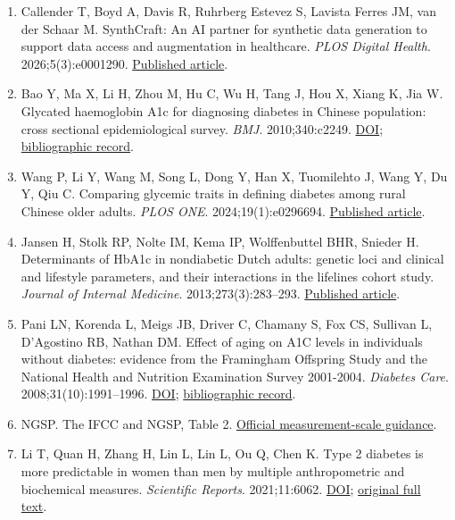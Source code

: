 \documentclass[10pt,twocolumn]{article}
\begin{document}
\begin{enumerate}
\item Callender T, Boyd A, Davis R, Ruhrberg Estevez S, Lavista Ferres JM, van der Schaar M. SynthCraft: An AI partner for synthetic data generation to support data access and augmentation in healthcare. \emph{PLOS Digital Health}. 2026;5(3):e0001290. \href{https://journals.plos.org/digitalhealth/article?id=10.1371/journal.pdig.0001290}{Published article}.

\item Bao Y, Ma X, Li H, Zhou M, Hu C, Wu H, Tang J, Hou X, Xiang K, Jia W. Glycated haemoglobin A1c for diagnosing diabetes in Chinese population: cross sectional epidemiological survey. \emph{BMJ}. 2010;340:c2249. \href{https://doi.org/10.1136/bmj.c2249}{DOI}; \href{https://pubmed.ncbi.nlm.nih.gov/20478961/}{bibliographic record}.

\item Wang P, Li Y, Wang M, Song L, Dong Y, Han X, Tuomilehto J, Wang Y, Du Y, Qiu C. Comparing glycemic traits in defining diabetes among rural Chinese older adults. \emph{PLOS ONE}. 2024;19(1):e0296694. \href{https://journals.plos.org/plosone/article?id=10.1371/journal.pone.0296694}{Published article}.

\item Jansen H, Stolk RP, Nolte IM, Kema IP, Wolffenbuttel BHR, Snieder H. Determinants of HbA1c in nondiabetic Dutch adults: genetic loci and clinical and lifestyle parameters, and their interactions in the lifelines cohort study. \emph{Journal of Internal Medicine}. 2013;273(3):283–293. \href{https://onlinelibrary.wiley.com/doi/10.1111/joim.12010}{Published article}.

\item Pani LN, Korenda L, Meigs JB, Driver C, Chamany S, Fox CS, Sullivan L, D'Agostino RB, Nathan DM. Effect of aging on A1C levels in individuals without diabetes: evidence from the Framingham Offspring Study and the National Health and Nutrition Examination Survey 2001-2004. \emph{Diabetes Care}. 2008;31(10):1991–1996. \href{https://doi.org/10.2337/dc08-0577}{DOI}; \href{https://pubmed.ncbi.nlm.nih.gov/18628569/}{bibliographic record}.

\item NGSP. The IFCC and NGSP, Table 2. \href{https://ngsp.org/ifccngsp.asp}{Official measurement-scale guidance}.

\item Li T, Quan H, Zhang H, Lin L, Lin L, Ou Q, Chen K. Type 2 diabetes is more predictable in women than men by multiple anthropometric and biochemical measures. \emph{Scientific Reports}. 2021;11:6062. \href{https://doi.org/10.1038/s41598-021-85581-z}{DOI}; \href{https://pmc.ncbi.nlm.nih.gov/articles/PMC7960723/}{original full text}.


\end{enumerate}
\end{document}
